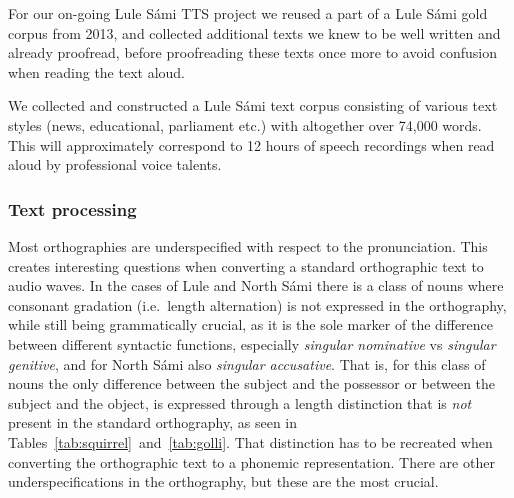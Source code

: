 \documentclass[free]{flammie}
\begin{document}
For our on-going Lule Sámi TTS  project we reused a part of a Lule Sámi gold
corpus from 2013, and collected additional texts we knew to be well written and
already proofread, before proofreading these texts once more to avoid confusion
when reading the text aloud.

We collected and constructed a Lule Sámi text corpus consisting of various text
styles (news, educational, parliament etc.) with altogether over 74,000 words.
This will approximately correspond to 12 hours of speech recordings when read
aloud by professional voice talents.


















\subsubsection{Text processing}


Most orthographies are underspecified with respect to the pronunciation. This
creates interesting questions when converting a standard orthographic text to
audio waves. In the cases of Lule and North Sámi there is a class of nouns where
consonant gradation (i.e.\ length alternation) is not expressed in the
orthography, while still being grammatically crucial, as it is the sole marker
of the difference between different syntactic functions, especially
\textit{singular nominative} vs \textit{singular genitive}, and for North Sámi
also  \textit{singular accusative}. That is, for this class of nouns the only
difference between the subject and the possessor or between the subject and the
object, is expressed through a length distinction that is \textit{not} present
in the standard orthography, as seen in
Tables~\ref{tab:squirrel}~and~\ref{tab:golli}. That distinction has to be
recreated when converting the orthographic text to a phonemic representation.
There are other underspecifications in the orthography, but these are the most
crucial.
\end{document}
